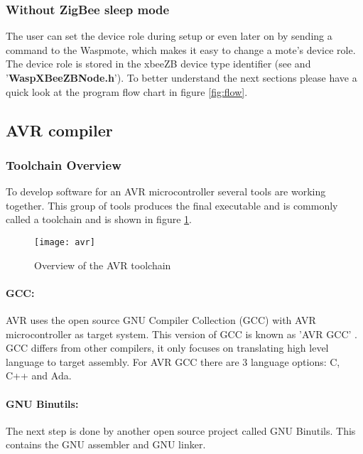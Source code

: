 \subsubsection{Without ZigBee sleep mode}
The user can set the device role during setup or even later on by sending a command to the Waspmote, which makes it easy to change a mote's device role. The device role is stored in the xbeeZB device type identifier (see  and '\textbf{WaspXBeeZBNode.h}').
To better understand the next sections please have a quick look at the program flow chart in figure \ref{fig:flow}.





\subsection{AVR compiler}
\subsubsection{Toolchain Overview}
To develop software for an AVR microcontroller several tools are working together. This group of tools produces the final executable and is commonly called a toolchain and is shown in figure \ref{fig:tool}. 
\begin{figure}[ht]
\centering
\texttt{[image: avr]}
\caption{Overview of the AVR toolchain}
\label{fig:tool}
\end{figure}
\paragraph{GCC:} AVR uses the open source GNU Compiler Collection (GCC) with AVR microcontroller as target system. This version of GCC is known as 'AVR GCC' . GCC differs from other compilers, it only focuses on translating high level language to target assembly. For AVR GCC there are 3 language options: C, C++ and Ada. 
\paragraph{GNU Binutils: }The next step is done by another open source project called GNU Binutils. This contains the GNU assembler and GNU linker.
